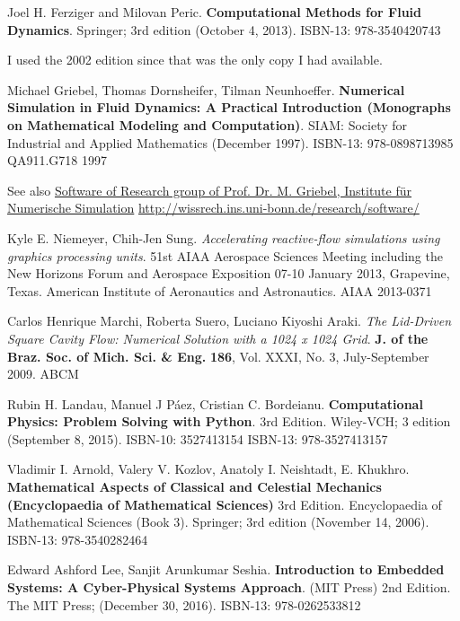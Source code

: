 \documentclass[10pt]{amsart}
\begin{document}
\begin{thebibliography}{9}
Joel H. Ferziger and Milovan Peric.  \textbf{Computational Methods for Fluid Dynamics}.  Springer; 3rd edition (October 4, 2013).  ISBN-13: 978-3540420743

I used the 2002 edition since that was the only copy I had available.  

Michael Griebel, Thomas Dornsheifer, Tilman Neunhoeffer.  \textbf{Numerical Simulation in Fluid Dynamics: A Practical Introduction (Monographs on Mathematical Modeling and Computation)}.  SIAM: Society for Industrial and Applied Mathematics (December 1997).  ISBN-13: 978-0898713985  QA911.G718  1997
  
See also \href{http://wissrech.ins.uni-bonn.de/research/software/}{Software of Research group of Prof. Dr. M. Griebel, Institute f\"{u}r Numerische Simulation} \url{http://wissrech.ins.uni-bonn.de/research/software/}

Kyle E. Niemeyer, Chih-Jen Sung.  \emph{Accelerating reactive-flow simulations using graphics processing units}.  51st AIAA Aerospace Sciences Meeting including the New Horizons Forum and Aerospace Exposition 07-10 January 2013, Grapevine, Texas. American Institute of Aeronautics and Astronautics.  AIAA 2013-0371

  Carlos Henrique Marchi, Roberta Suero, Luciano Kiyoshi Araki.  \emph{The Lid-Driven Square Cavity Flow: Numerical Solution with a 1024 x 1024 Grid}.  \textbf{J. of the Braz. Soc. of Mich. Sci. \& Eng.}  \textbf{186}, Vol. XXXI, No. 3, July-September 2009.  ABCM

Rubin H. Landau, Manuel J P\'{a}ez, Cristian C. Bordeianu.  \textbf{Computational Physics: Problem Solving with Python}.  3rd Edition.  Wiley-VCH; 3 edition (September 8, 2015).  ISBN-10: 3527413154  ISBN-13: 978-3527413157


Vladimir I. Arnold, Valery V. Kozlov, Anatoly I. Neishtadt, E. Khukhro.  \textbf{Mathematical Aspects of Classical and Celestial Mechanics (Encyclopaedia of Mathematical Sciences)} 3rd Edition.  Encyclopaedia of Mathematical Sciences (Book 3).  Springer; 3rd edition (November 14, 2006).  ISBN-13: 978-3540282464



Edward Ashford Lee, Sanjit Arunkumar Seshia.   \textbf{Introduction to Embedded Systems: A Cyber-Physical Systems Approach}. (MIT Press) 2nd Edition. The MIT Press; (December 30, 2016).  ISBN-13: 978-0262533812




  
\end{thebibliography}
\end{document}
